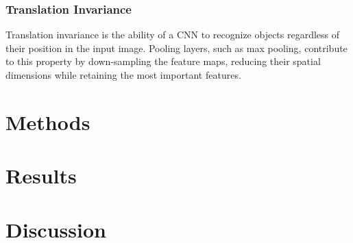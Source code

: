 \documentclass[english,11pt,a4paper,titlepage]{article}
\begin{document}
	\subsubsection*{Translation Invariance}
	Translation invariance is the ability of a CNN to recognize objects regardless of their position in the input image. Pooling layers, such as max pooling, contribute to this property by down-sampling the feature maps, reducing their spatial dimensions while retaining the most important features.
	
	
\section*{Methods}

\section*{Results}

\section*{Discussion}

\newpage
\printbibliography
\end{document}
